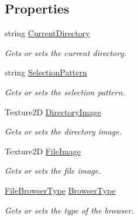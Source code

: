 \subsection*{Properties}
\begin{DoxyCompactItemize}
\item 
string \hyperlink{class_lerp2_a_p_i_editor_1_1_utility_1_1_file_browser_editor_a9580d77b6a46cfb5978fe22a34e33b30}{Current\+Directory}
\begin{DoxyCompactList}\small\item\em Gets or sets the current directory. \end{DoxyCompactList}\item 
string \hyperlink{class_lerp2_a_p_i_editor_1_1_utility_1_1_file_browser_editor_a3a12ddbbcb1313b97cb483d43cf6e83c}{Selection\+Pattern}
\begin{DoxyCompactList}\small\item\em Gets or sets the selection pattern. \end{DoxyCompactList}\item 
Texture2D \hyperlink{class_lerp2_a_p_i_editor_1_1_utility_1_1_file_browser_editor_a4eb7d3588a623916433e799d1be77cf1}{Directory\+Image}
\begin{DoxyCompactList}\small\item\em Gets or sets the directory image. \end{DoxyCompactList}\item 
Texture2D \hyperlink{class_lerp2_a_p_i_editor_1_1_utility_1_1_file_browser_editor_a86df058454c404ca0aeb7fe8fd195e87}{File\+Image}
\begin{DoxyCompactList}\small\item\em Gets or sets the file image. \end{DoxyCompactList}\item 
\hyperlink{namespace_lerp2_a_p_i_1_1_utility_af5d628470963cc0f18c37055b4170bf1}{File\+Browser\+Type} \hyperlink{class_lerp2_a_p_i_editor_1_1_utility_1_1_file_browser_editor_a4e5169dc722f5cbc76085eb86f4a4947}{Browser\+Type}
\begin{DoxyCompactList}\small\item\em Gets or sets the type of the browser. \end{DoxyCompactList}\item 

\end{DoxyCompactItemize}
